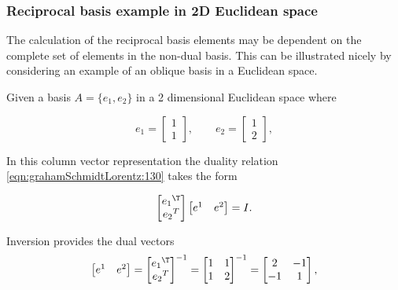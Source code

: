 \subsubsection{Reciprocal basis example in 2D Euclidean space}

The calculation of the reciprocal basis elements may be dependent on the complete set of elements in the non-dual basis.  This can be illustrated nicely by considering an example of an oblique basis in a Euclidean space.

Given a basis $A = \{e_1, e_2\}$ in a 2 dimensional Euclidean space where

\begin{equation}\label{eqn:grahamSchmidtLorentz:90}
e_1 =
\begin{bmatrix}
1 \\
1
\end{bmatrix},\qquad
e_2 =
\begin{bmatrix}
1 \\
2
\end{bmatrix},
\end{equation}

In this column vector representation the duality relation \ref{eqn:grahamSchmidtLorentz:130} takes the form

\begin{equation}\label{eqn:grahamSchmidtLorentz:150}
\begin{bmatrix}
{e_1}^\T \\
{e_2}^T
\end{bmatrix}
\begin{bmatrix}
e^1 & e^2
\end{bmatrix} = I.
\end{equation}

Inversion provides the dual vectors
\begin{equation}\label{eqn:grahamSchmidtLorentz:170}
\begin{bmatrix}
e^1 & e^2
\end{bmatrix}
=
{
\begin{bmatrix}
{e_1}^\T \\
{e_2}^T
\end{bmatrix}
}^{-1}
=
{\begin{bmatrix}
1 & 1 \\
1 & 2
\end{bmatrix}}^{-1}
=
\begin{bmatrix}
2 & -1 \\
-1 & 1
\end{bmatrix},
\end{equation}

